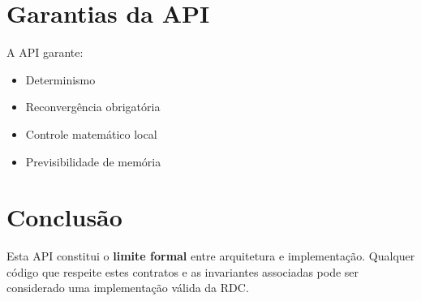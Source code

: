 \documentclass[12pt,a4paper]{article}
\begin{document}
	\section{Garantias da API}
	
	A API garante:
	
	\begin{itemize}[leftmargin=2em]
		\item Determinismo
		\item Reconvergência obrigatória
		\item Controle matemático local
		\item Previsibilidade de memória
	\end{itemize}
	
	\section{Conclusão}
	
	Esta API constitui o \textbf{limite formal} entre arquitetura e implementação.
	Qualquer código que respeite estes contratos e as invariantes associadas pode ser
	considerado uma implementação válida da RDC.
	
\end{document}
